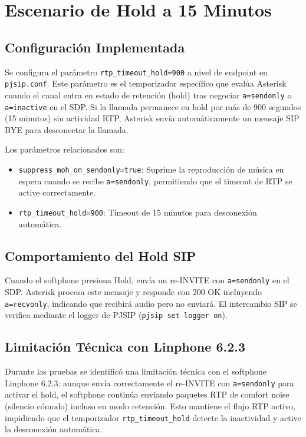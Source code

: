 \documentclass[12pt,a4paper]{article}
\begin{document}
\section{Escenario de Hold a 15 Minutos}

\subsection{Configuración Implementada}

Se configura el parámetro \texttt{rtp\_timeout\_hold=900} a nivel de endpoint en \texttt{pjsip.conf}. Este parámetro es el temporizador específico que evalúa Asterisk cuando el canal entra en estado de retención (hold) tras negociar \texttt{a=sendonly} o \texttt{a=inactive} en el SDP. Si la llamada permanece en hold por más de 900 segundos (15 minutos) sin actividad RTP, Asterisk envía automáticamente un mensaje SIP BYE para desconectar la llamada.

Los parámetros relacionados son:
\begin{itemize}
    \item \texttt{suppress\_moh\_on\_sendonly=true}: Suprime la reproducción de música en espera cuando se recibe \texttt{a=sendonly}, permitiendo que el timeout de RTP se active correctamente.
    \item \texttt{rtp\_timeout\_hold=900}: Timeout de 15 minutos para desconexión automática.
\end{itemize}

\subsection{Comportamiento del Hold SIP}

Cuando el softphone presiona Hold, envía un re-INVITE con \texttt{a=sendonly} en el SDP. Asterisk procesa este mensaje y responde con 200 OK incluyendo \texttt{a=recvonly}, indicando que recibirá audio pero no enviará. El intercambio SIP se verifica mediante el logger de PJSIP (\texttt{pjsip set logger on}).

\subsection{Limitación Técnica con Linphone 6.2.3}

Durante las pruebas se identificó una limitación técnica con el softphone Linphone 6.2.3: aunque envía correctamente el re-INVITE con \texttt{a=sendonly} para activar el hold, el softphone continúa enviando paquetes RTP de comfort noise (silencio cómodo) incluso en modo retención. Esto mantiene el flujo RTP activo, impidiendo que el temporizador \texttt{rtp\_timeout\_hold} detecte la inactividad y active la desconexión automática.
\end{document}
